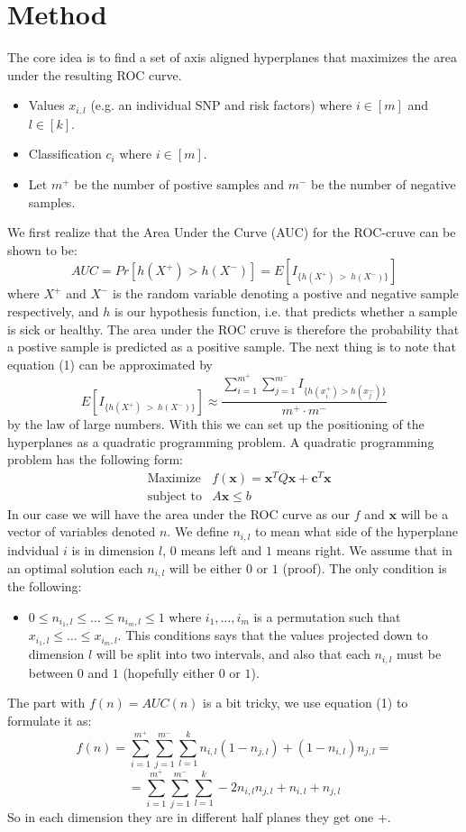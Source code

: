 \documentclass[a4paper]{article}
\begin{document}
\section{Method}
The core idea is to find a set of axis aligned hyperplanes that maximizes the area under the resulting ROC curve.
\begin{itemize}
  \item Values $x_{i,l}$ (e.g. an individual SNP and risk factors) where $i \in [m]$ and $l \in [k]$.
  \item Classification $c_i$ where $i \in [m]$.
  \item Let $m^+$ be the number of postive samples and $m^-$ be the number of negative samples.
\end{itemize}
We first realize that the Area Under the Curve (AUC) for the ROC-cruve can be shown to be:
\begin{equation}
AUC = Pr[h(X^+) > h(X^-)] = E[I_{\{h(X^+)\ >\ h(X^-)\}}]
\end{equation}
where $X^+$ and $X^-$ is the random variable denoting a postive and negative sample respectively, and $h$ is our hypothesis function, i.e. that predicts whether a sample is sick or healthy. The area under the ROC cruve is therefore the probability that a postive sample is predicted as a positive sample. The next thing is to note that equation (1) can be approximated by
$$E[I_{\{h(X^+)\ >\ h(X^-)\}}] \approx \frac{ \sum_{i=1}^{m^+}\sum_{j=1}^{m^-} I_{\{h(x_i^+) > h(x_j^-)\} }}{m^+ \cdot m^-}$$
by the law of large numbers. With this we can set up the positioning of the hyperplanes as a quadratic programming problem. A quadratic programming problem has the following form:
\begin{align*}
&\text{Maximize} & f(\mathbf{x}) = \mathbf{x}^TQ\mathbf{x} + \mathbf{c}^T\mathbf{x}\\
&\text{subject to} & A\mathbf{x} \leq b
\end{align*}
In our case we will have the area under the ROC curve as our $f$ and $\mathbf{x}$ will be a vector of variables denoted $n$. We define $n_{i,l}$ to mean what side of the hyperplane indvidual $i$ is in dimension $l$, $0$ means left and $1$ means right. We assume that in an optimal solution each $n_{i,l}$ will be either $0$ or $1$ (proof). The only condition is the following:
\begin{itemize}
  \item $0 \leq n_{i_1,l} \leq \dots \leq n_{i_m,l} \leq 1$ where $i_1, \dots, i_m$ is a permutation such that $x_{i_1,l} \leq \dots \leq x_{i_m,l}$. This conditions says that the values projected down to dimension $l$ will be split into two intervals, and also that each $n_{i,l}$ must be between $0$ and $1$ (hopefully either $0$ or $1$).
\end{itemize}
The part with $f(n) = AUC(n)$ is a bit tricky, we use equation (1) to formulate it as:
$$ f(n) = \sum_{i=1}^{m^+}\sum_{j=1}^{m^-} \sum_{l=1}^k n_{i,l}(1 - n_{j,l}) + (1-n_{i,l})n_{j,l} =$$
$$ = \sum_{i=1}^{m^+}\sum_{j=1}^{m^-} \sum_{l=1}^k -2n_{i,l}n_{j,l} + n_{i,l} + n_{j,l}$$
So in each dimension they are in different half planes they get one +.
\end{document}
